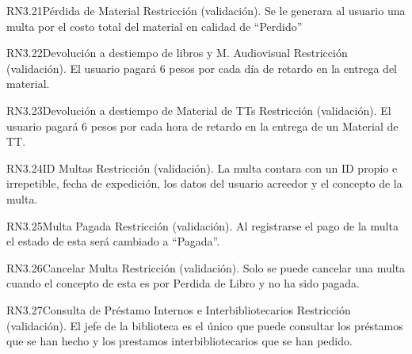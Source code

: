 \begin{BussinesRule}{RN3.21}{Pérdida de Material} 
	\BRitem[Tipo:] Restricción (validación).
	\BRitem[Descripción:]Se le generara al usuario una multa por el costo total del material en calidad de “Perdido”
\end{BussinesRule}

\begin{BussinesRule}{RN3.22}{Devolución a destiempo de libros y M. Audiovisual} 
	\BRitem[Tipo:] Restricción (validación).
	\BRitem[Descripción:]El usuario pagará 6 pesos por cada día de retardo en la entrega del material.
\end{BussinesRule}

\begin{BussinesRule}{RN3.23}{Devolución a destiempo de Material de TTs} 
	\BRitem[Tipo:] Restricción (validación).
	\BRitem[Descripción:]El usuario pagará 6 pesos por cada hora de retardo en la entrega de un Material de TT. 
\end{BussinesRule}

\begin{BussinesRule}{RN3.24}{ID Multas} 
	\BRitem[Tipo:] Restricción (validación).
	\BRitem[Descripción:]La multa contara con un ID propio e irrepetible, fecha de expedición, los datos del usuario acreedor y el concepto de la multa.


\end{BussinesRule}

\begin{BussinesRule}{RN3.25}{Multa Pagada} 
	\BRitem[Tipo:] Restricción (validación).
	\BRitem[Descripción:]Al registrarse el pago de la multa el estado de esta será cambiado a “Pagada”.
\end{BussinesRule}

\begin{BussinesRule}{RN3.26}{Cancelar Multa} 
	\BRitem[Tipo:] Restricción (validación).
	\BRitem[Descripción:]Solo se puede cancelar una multa cuando el concepto de esta es por Perdida de Libro y no ha sido pagada.
\end{BussinesRule}

\begin{BussinesRule}{RN3.27}{Consulta de Préstamo Internos e Interbibliotecarios} 
	\BRitem[Tipo:] Restricción (validación).
	\BRitem[Descripción:]El jefe de la biblioteca es el único que puede consultar los préstamos que se han hecho y los prestamos interbibliotecarios que se han pedido.
\end{BussinesRule}


